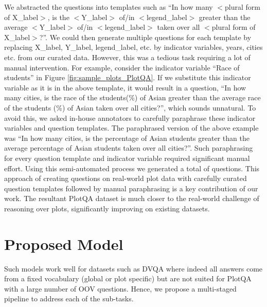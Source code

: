 \documentclass[10pt,twocolumn,letterpaper]{article}
\begin{document}
We abstracted the questions into templates such as ``In how many $<$plural form of X\_label$>$, is the $<$Y\_label$>$ of/in $<$legend\_label$>$ greater than the average $<$Y\_label$>$ of/in $<$legend\_label$>$ taken over all $<$plural form of X\_label$>$?''. We could then generate multiple questions for each template by replacing X\_label, Y\_label, legend\_label, etc. by indicator variables, years, cities etc. from our curated data. However, this was a tedious task requiring a lot of manual intervention. For example, consider the indicator variable ``Race of students'' in Figure \ref{fig:sample_plots_PlotQA}. 
If we substitute this indicator variable as it is in the above template, it would result in a question, ``In how many cities, is the race of the students(\%) of Asian greater than the average race of the students (\%) of Asian taken over all cities?'', which sounds unnatural. To avoid this, we asked in-house annotators to carefully paraphrase these indicator variables and question templates. The paraphrased version of the above example was ``In how many cities, is the percentage of Asian students greater than the average percentage of Asian students taken over all cities?''. Such paraphrasing for every question template and indicator variable required significant manual effort. Using this semi-automated process we generated a total of  questions. This approach of creating questions on real-world plot data with carefully curated question templates followed by manual paraphrasing is a key contribution of our work. 
The resultant PlotQA dataset is much closer to the real-world challenge of reasoning over plots, significantly improving on existing datasets.





\section{Proposed Model}
\label{sec:proposed_model}


 Such models work well for datasets such as DVQA where indeed all answers come from a fixed vocabulary (global or plot specific) but are not suited for PlotQA with a large number of OOV questions. 
Hence, we propose a multi-staged pipeline to address each of the sub-tasks.
\end{document}

